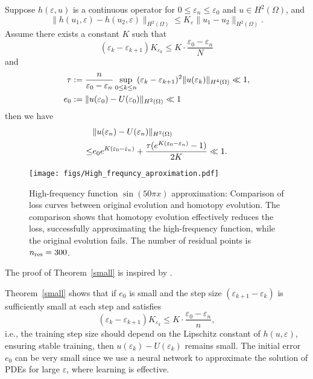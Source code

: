 \begin{theorem}\label{small}
    Suppose \( h(\varepsilon,u) \) is a continuous operator for \( 0 \leq \varepsilon_n \leq \varepsilon_0 \) and \( u \in H^2(\Omega) \), and 
    \[
    \|h(u_1,\varepsilon)-h(u_2,\varepsilon)\|_{H^2(\Omega)}\le K_\varepsilon\|u_1-u_2\|_{H^2(\Omega)}.
    \]
    Assume there exists a constant \( K \) such that 
    \[
    (\varepsilon_k-\varepsilon_{k+1})K_{\varepsilon_k}\le K\cdot \frac{\varepsilon_0-\varepsilon_n}{N}
    \]
    and 
    \begin{align}
    \tau&:=\frac{n}{\varepsilon_0-\varepsilon_n} \sup_{0\leq k\leq n} (\varepsilon_k-\varepsilon_{k+1})^2\|u(\varepsilon_k)\|_{H^4(\Omega)}\ll 1,\notag\\e_0&:=\|u(\varepsilon_0)-U(\varepsilon_0)\|_{H^2(\Omega)}  \ll 1 \notag
    \end{align}
    then we have 
    \begin{align}
        &\|u(\varepsilon_n)- U(\varepsilon_n)\|_{H^2(\Omega)}\notag\\\le& e_0e^{K(\varepsilon_0-\varepsilon_n)}+\frac{\tau(e^{K(\varepsilon_0-\varepsilon_n)}-1)}{2K} \ll 1.
    \end{align}
\end{theorem}

\begin{figure*}[htbp!]
    \centering
    \texttt{[image: figs/High\_frequncy\_aproximation.pdf]}
    \caption{High-frequency function $\sin(50\pi x)$ approximation: Comparison of loss curves between original evolution and homotopy evolution. The comparison shows that homotopy evolution effectively reduces the loss, successfully approximating the high-frequency function, while the original evolution fails. The number of residual points is $n_\textup{res} = 300$. }
\label{fig:high_frequency_result}
\end{figure*}


   The proof of Theorem~\ref{small} is inspired by \cite{antonakopoulos2022adagrad}.  

Theorem~\ref{small} shows that if \( e_0 \) is small and the step size \( (\varepsilon_{k+1} - \varepsilon_k) \) is sufficiently small at each step and satisfies  
\[
(\varepsilon_k - \varepsilon_{k+1}) K_{\varepsilon_k} \leq K \cdot \frac{\varepsilon_0 - \varepsilon_n}{n},
\]
i.e., the training step size should depend on the Lipschitz constant of \( h(u,\varepsilon) \), ensuring stable training, then \( u(\varepsilon_k) - U(\varepsilon_k) \) remains small. The initial error \( e_0 \) can be very small since we use a neural network to approximate the solution of PDEs for large \( \varepsilon \), where learning is effective.  

